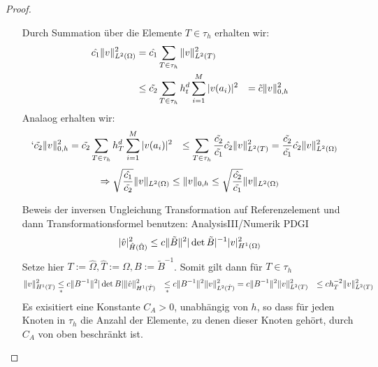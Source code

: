 \begin{proof}
\begin{enumerate}
    Durch Summation über die Elemente $T\in \tau_h$ erhalten wir:
    \begin{align*}
      \hat{c_1} \|v\|_{L^2(\Omega)}^2 &= \hat{c_1} \sum_{T\in \tau_h} \|v\|_{L^2(T)}^2 \\
                                         &\leq \tilde{c_2} \sum_{T\in\tau_h} h_t^d \sum_{i=1}^{M} |v(a_i)|^2
                                         &= \tilde{c} \|v\|^2_{0,h}
    \end{align*}
    Analaog erhalten wir:
    \begin{align*}`
      \tilde{c_2}\|v\|_{0,h}^2 &= \tilde{c_2} \sum_{T\in\tau_h} h_T^d \sum_{i=1}^{M} |v(a_i)|^2
      &\leq \sum_{T\in\tau_h} \frac{\tilde{c_2}}{\tilde{c_1}} \hat{c_2} \|v\|_{L^2(T)}^2
      &= \frac{\tilde{c_2}}{\tilde{c_1}} \hat{c_2} \|v\|^2_{L^2(\Omega)}
    \end{align*}
    \[
      \Rightarrow \sqrt{\frac{\hat{c_1}}{\tilde{c_2}}} \|v\|_{L^2(\Omega)} \leq \|v\|_{0,h} \leq \sqrt{\frac{\hat{c_2}}{\tilde{c_1}}}\|v\|_{L^2(\Omega)}
    \]
  \item[Beweis der inversen Ungleichung]
    Transformation auf Referenzelement und dann Transformationsformel benutzen: AnalysisIII/Numerik PDGI
    \begin{equation*}
      |\hat{v}|^2_{\hat{H}(\hat{\Omega})} \leq c \|\tilde{B}\|^2 |\det \tilde{B}|^{-1} |v|^2_{H^1(\Omega)}
    \end{equation*}
    Setze hier $T:=\hat{\Omega}, \hat{T}:=\Omega, B:=\tilde{B}^{-1}$. Somit gilt dann für $T\in\tau_h$
    \begin{align}
      \|v\|^2_{H^1(T)} &\underset{*}{\leq} c\|B^{-1}\|^2 |\det B| \|\hat{v}\|^2_{H^1(\hat{T})}
      &\underset{*}{\leq} c\|B^{-1}\|^2 \|v\|^2_{L^2(\hat{T})}
      &= c\|B^{-1}\|^2 \|v\|^2_{L^2(T)}
      &\leq c h^{-2}_T \|v\|^2_{L^2(T)}
      \label{}
    \end{align}
    Es exisitiert eine Konstante $C_A>0$, unabhängig von $h$, so dass für jeden Knoten in $\tau_h$ die Anzahl der Elemente, zu denen dieser Knoten gehört, durch $C_A$ von oben beschränkt ist. 
  \end{enumerate}
\end{proof}
